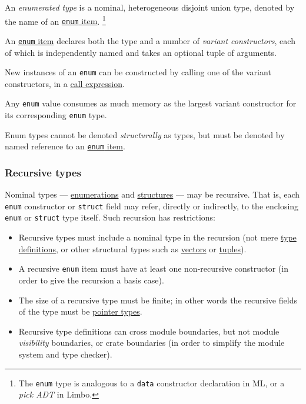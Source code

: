\documentclass[]{article}
\begin{document}
An \emph{enumerated type} is a nominal, heterogeneous disjoint union
type, denoted by the name of an \hyperref[enumerations]{\texttt{enum}
item}. \footnote{The \texttt{enum} type is analogous to a \texttt{data}
  constructor declaration in ML, or a \emph{pick ADT} in Limbo.}

An \hyperref[enumerations]{\texttt{enum} item} declares both the type
and a number of \emph{variant constructors}, each of which is
independently named and takes an optional tuple of arguments.

New instances of an \texttt{enum} can be constructed by calling one of
the variant constructors, in a \hyperref[call-expressions]{call
expression}.

Any \texttt{enum} value consumes as much memory as the largest variant
constructor for its corresponding \texttt{enum} type.

Enum types cannot be denoted \emph{structurally} as types, but must be
denoted by named reference to an \hyperref[enumerations]{\texttt{enum}
item}.

\subsubsection{Recursive types}\label{recursive-types}

Nominal types --- \hyperref[enumerated-types]{enumerations} and
\hyperref[structure-types]{structures} --- may be recursive. That is,
each \texttt{enum} constructor or \texttt{struct} field may refer,
directly or indirectly, to the enclosing \texttt{enum} or
\texttt{struct} type itself. Such recursion has restrictions:

\begin{itemize}
\itemsep1pt\parskip0pt
\item
  Recursive types must include a nominal type in the recursion (not mere
  \hyperref[type-definitions]{type definitions}, or other structural
  types such as \hyperref[vector-types]{vectors} or
  \hyperref[tuple-types]{tuples}).
\item
  A recursive \texttt{enum} item must have at least one non-recursive
  constructor (in order to give the recursion a basis case).
\item
  The size of a recursive type must be finite; in other words the
  recursive fields of the type must be \hyperref[pointer-types]{pointer
  types}.
\item
  Recursive type definitions can cross module boundaries, but not module
  \emph{visibility} boundaries, or crate boundaries (in order to
  simplify the module system and type checker).
\end{itemize}
\end{document}
